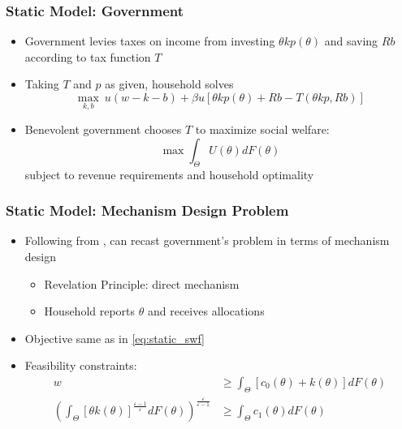 \documentclass{beamer}
\begin{document}
\begin{frame}
    \frametitle{Static Model: Government}

    \begin{itemize}
        \item Government levies taxes on income from investing \( \theta k p(\theta) \) and saving \( Rb \) according to tax function \( T \)
        \item Taking \( T \) and \( p \) as given, household solves 
        \begin{equation*}
            \max_{k,b}\ u\left(w-k-b\right)+\beta u\left[\theta kp\left(\theta\right)+Rb-T\left(\theta kp,Rb\right)\right]
        \end{equation*} 
        \item Benevolent government chooses \( T \) to maximize social welfare: 
        \begin{equation}
            \max \int_{\Theta}U\left(\theta\right)dF\left(\theta\right) \label{eq:static_swf}
        \end{equation}
        subject to revenue requirements and household optimality 
    \end{itemize}

\end{frame}

\begin{frame}
    \frametitle{Static Model: Mechanism Design Problem}

    \begin{itemize}
        \item Following from \cite{mirrlees1971exploration}, can recast government's problem in terms of mechanism design
        \begin{itemize}
            \item Revelation Principle: direct mechanism
            \item Household reports \( \theta \) and receives allocations
        \end{itemize} 
        \item Objective same as in \eqref{eq:static_swf}
        \item Feasibility constraints: 
        \begin{align*}
            w&\ge\int_{\Theta}\left[c_{0}\left(\theta\right)+k\left(\theta\right)\right]dF\left(\theta\right) \\
            \left(\int_{\Theta}\left[\theta k\left(\theta\right)\right]^{\frac{\varepsilon-1}{\varepsilon}}dF\left(\theta\right)\right)^{\frac{\varepsilon}{\varepsilon-1}}&\ge\int_{\Theta}c_{1}\left(\theta\right)dF\left(\theta\right) 
        \end{align*}
    \end{itemize}

\end{frame}
\end{document}
